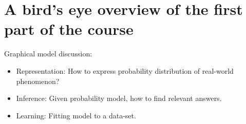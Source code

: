 \documentclass{article}
\begin{document}
\section[]{A bird’s eye overview of the first part of the course}
    
    Graphical model discussion:
    \begin{itemize}
        \item Representation: How to express probability distribution of real-world phenomenon?
        \item Inference: Given probability model, how to find relevant answers.
        \item Learning: Fitting model to a data-set.
    \end{itemize}
    

\printbibliography[title={Referências}]
\end{document}
